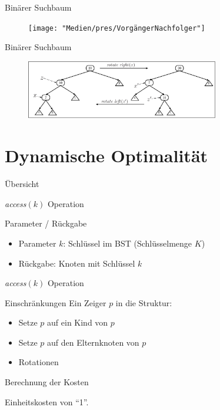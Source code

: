 \documentclass[11pt]{beamer}
\begin{document}
			\begin{frame} {Binärer Suchbaum}
			\begin{figure}[h]
				\centering
				\texttt{[image: "Medien/pres/VorgängerNachfolger"]}
			\end{figure}    
		\end{frame}
	
	\begin{frame} {Binärer Suchbaum}
			\begin{figure}[h]
				\centering
				\includegraphics[width=0.75\textwidth]{"Medien/pres/LinksRechtsRotation"}
			\end{figure}    
		\end{frame}	
	
	\section{Dynamische Optimalität}
	
		\begin{frame} {Übersicht}
			\tableofcontents[currentsection]   
		\end{frame}
	
	   
    
    
  \begin{frame} {	\textit{access}$\left(k\right)$ Operation}
    \begin{block}{Parameter / Rückgabe}
    	\begin{itemize}
    		\item Parameter $k$: Schlüssel im BST (Schlüsselmenge $K$)
    		\item Rückgabe: Knoten mit Schlüssel $k$
      \end{itemize}
    			
    \end{block}	
  \end{frame}	
     
     \begin{frame} {	\textit{access}$\left(k\right)$ Operation}
     	\begin{block}{Einschränkungen}
     		Ein Zeiger $p$ in die Struktur:
     		\begin{itemize}
     			\item Setze $p$ auf ein Kind von $p$ 
     			\item Setze $p$ auf den Elternknoten von $p$ 
     			\item Rotationen 
     		\end{itemize}	
     	\end{block}	
     	\pause 
     	\begin{block}{Berechnung der Kosten}
     		
     		Einheitskosten von \enquote{1}.
     	\end{block}	    	
     \end{frame}	    
     
\end{document}
